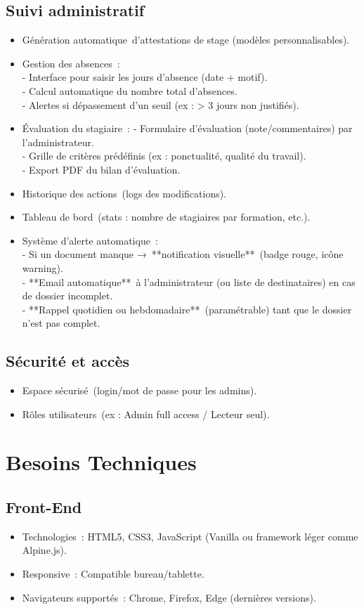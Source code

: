 \documentclass{report}
\begin{document}
\subsection*{Suivi administratif}
\begin{itemize}
  \item Génération automatique d’attestations de stage (modèles personnalisables).
  \item Gestion des absences :\\
    - Interface pour saisir les jours d’absence (date + motif).\\
    - Calcul automatique du nombre total d’absences.\\
    - Alertes si dépassement d’un seuil (ex : > 3 jours non justifiés).
  \item Évaluation du stagiaire :
    - Formulaire d’évaluation (note/commentaires) par l’administrateur.\\
    - Grille de critères prédéfinis (ex : ponctualité, qualité du travail).\\
    - Export PDF du bilan d’évaluation.
  \item Historique des actions (logs des modifications).
  \item Tableau de bord (stats : nombre de stagiaires par formation, etc.).
  \item Système d’alerte automatique :\\
    - Si un document manque → **notification visuelle** (badge rouge, icône warning).\\
    - **Email automatique** à l’administrateur (ou liste de destinataires) en cas de dossier incomplet.\\
    - **Rappel quotidien ou hebdomadaire** (paramétrable) tant que le dossier n’est pas complet.
\end{itemize}
\subsection*{Sécurité et accès}
\begin{itemize}
  \item Espace sécurisé (login/mot de passe pour les admins).
  \item Rôles utilisateurs (ex : Admin full access / Lecteur seul).
\end{itemize}
\section*{Besoins Techniques}
\subsection*{Front-End}
\begin{itemize}
  \item Technologies : HTML5, CSS3, JavaScript (Vanilla ou framework léger comme Alpine.js).
  \item Responsive : Compatible bureau/tablette.
  \item Navigateurs supportés : Chrome, Firefox, Edge (dernières versions).
\end{itemize}
\end{document}
